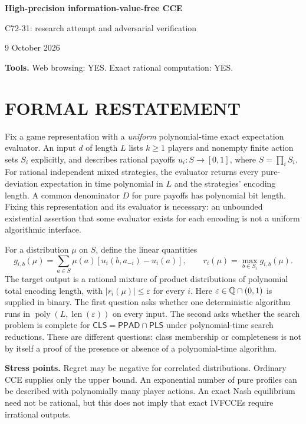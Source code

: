 \documentclass[11pt,a4paper]{article}
\theoremstyle{definition}\newtheorem{definition}[theorem]{Definition}
\theoremstyle{remark}\newtheorem{remark}[theorem]{Remark}
\newcommand{\1}{\mathbf 1}
\begin{document}
\begin{center}
{\Large\bfseries High-precision information-value-free CCE}\par
\medskip
{\large C72-31: research attempt and adversarial verification}\par
9 October 2026
\end{center}
\textbf{Tools.} Web browsing: YES. Exact rational computation: YES.\par
\section{FORMAL RESTATEMENT}
Fix a game representation with a \emph{uniform} polynomial-time exact expectation evaluator. An input $d$ of length $L$ lists $k\ge1$ players and nonempty finite action sets $S_i$ explicitly, and describes rational payoffs $u_i:S\to[0,1]$, where $S=\prod_iS_i$. For rational independent mixed strategies, the evaluator returns every pure-deviation expectation in time polynomial in $L$ and the strategies' encoding length. A common denominator $D$ for pure payoffs has polynomial bit length. Fixing this representation and its evaluator is necessary: an unbounded existential assertion that some evaluator exists for each encoding is not a uniform algorithmic interface.

For a distribution $\mu$ on $S$, define the linear quantities
\[
 g_{i,b}(\mu)=\sum_{a\in S}\mu(a)[u_i(b,a_{-i})-u_i(a)],
 \qquad r_i(\mu)=\max_{b\in S_i}g_{i,b}(\mu).
\]
The target output is a rational mixture of product distributions of polynomial total encoding length, with $|r_i(\mu)|\le\varepsilon$ for every $i$. Here $\varepsilon\in\mathbb Q\cap(0,1)$ is supplied in binary. The first question asks whether one deterministic algorithm runs in $\operatorname{poly}(L,\operatorname{len}(\varepsilon))$ on every input. The second asks whether the search problem is complete for $\mathsf{CLS}=\mathsf{PPAD}\cap\mathsf{PLS}$ under polynomial-time search reductions. These are different questions: class membership or completeness is not by itself a proof of the presence or absence of a polynomial-time algorithm.

\textbf{Stress points.} Regret may be negative for correlated distributions. Ordinary CCE supplies only the upper bound. An exponential number of pure profiles can be described with polynomially many player actions. An exact Nash equilibrium need not be rational, but this does not imply that exact IVFCCEs require irrational outputs.
\end{document}

